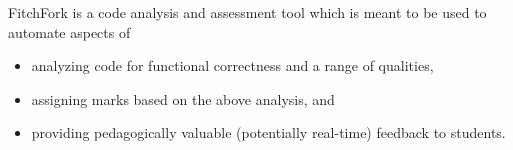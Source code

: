 FitchFork is a code analysis and assessment tool which is meant to be used to automate aspects of 
\begin{itemize}
  \item analyzing code for functional correctness and a range of qualities,
  \item assigning marks based on the above analysis, and
  \item providing pedagogically valuable (potentially real-time) feedback to students.
\end{itemize}